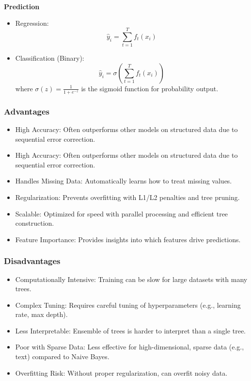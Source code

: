 \textbf{Prediction}

\begin{itemize}
    \item Regression:
    \[\hat{y}_i = \sum_{t=1}^T f_t(x_i)\]

    \item Classification (Binary):
    \[\hat{y}_i = \sigma \left( \sum_{t=1}^T f_t(x_i) \right)\]
    where $\sigma(z) = \frac{1}{1+e^{-z}}$ is the sigmoid function for probability output.
\end{itemize}

\subsubsection{Advantages}
\begin{itemize}
    \item High Accuracy: Often outperforms other models on structured data due to sequential error correction.
    \item High Accuracy: Often outperforms other models on structured data due to sequential error correction.
    \item Handles Missing Data: Automatically learns how to treat missing values.
    \item Regularization: Prevents overfitting with L1/L2 penalties and tree pruning.
    \item Scalable: Optimized for speed with parallel processing and efficient tree construction.
    \item Feature Importance: Provides insights into which features drive predictions.
\end{itemize}

\subsubsection{Disadvantages}
\begin{itemize}
    \item Computationally Intensive: Training can be slow for large datasets with many trees.
    \item Complex Tuning: Requires careful tuning of hyperparameters (e.g., learning rate, max depth).
    \item Less Interpretable: Ensemble of trees is harder to interpret than a single tree.
    \item Poor with Sparse Data: Less effective for high-dimensional, sparse data (e.g., text) compared to Naive Bayes.
    \item Overfitting Risk: Without proper regularization, can overfit noisy data.
\end{itemize}